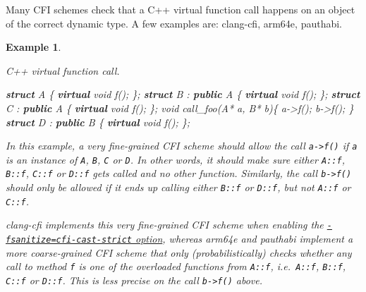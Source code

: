 \documentclass[
  a4paper,
]{report}
\newtheorem{example}{Example}
\newenvironment{Shaded}{}{}
\newcommand{\DataTypeTok}[1]{\textcolor[rgb]{0.56,0.13,0.00}{#1}}
\newcommand{\KeywordTok}[1]{\textcolor[rgb]{0.00,0.44,0.13}{\textbf{#1}}}
\newcommand{\NormalTok}[1]{#1}
\newcommand{\OperatorTok}[1]{\textcolor[rgb]{0.40,0.40,0.40}{#1}}
\begin{document}
Many CFI schemes check that a
\label{__index_entry_39}{C++} virtual function
call happens on an object of the correct dynamic type. A few examples
are: clang-cfi, arm64e, pauthabi.

\begin{example}

\label{}

\textup{C++ virtual function call.}

\begin{Shaded}
\begin{Highlighting}[]
\KeywordTok{struct}\NormalTok{ A }\OperatorTok{\{}
  \KeywordTok{virtual} \DataTypeTok{void}\NormalTok{ f}\OperatorTok{();}
\OperatorTok{\};}
\KeywordTok{struct}\NormalTok{ B }\OperatorTok{:} \KeywordTok{public}\NormalTok{ A }\OperatorTok{\{}
  \KeywordTok{virtual} \DataTypeTok{void}\NormalTok{ f}\OperatorTok{();}
\OperatorTok{\};}
\KeywordTok{struct}\NormalTok{ C }\OperatorTok{:} \KeywordTok{public}\NormalTok{ A }\OperatorTok{\{}
  \KeywordTok{virtual} \DataTypeTok{void}\NormalTok{ f}\OperatorTok{();}
\OperatorTok{\};}
\DataTypeTok{void}\NormalTok{ call\_foo}\OperatorTok{(}\NormalTok{A}\OperatorTok{*}\NormalTok{ a}\OperatorTok{,}\NormalTok{ B}\OperatorTok{*}\NormalTok{ b}\OperatorTok{)\{}
\NormalTok{  a}\OperatorTok{{-}\textgreater{}}\NormalTok{f}\OperatorTok{();}
\NormalTok{  b}\OperatorTok{{-}\textgreater{}}\NormalTok{f}\OperatorTok{();}
\OperatorTok{\}}
\KeywordTok{struct}\NormalTok{ D }\OperatorTok{:} \KeywordTok{public}\NormalTok{ B }\OperatorTok{\{}
  \KeywordTok{virtual} \DataTypeTok{void}\NormalTok{ f}\OperatorTok{();}
\OperatorTok{\};}
\end{Highlighting}
\end{Shaded}

In this example, a very fine-grained CFI scheme should allow the call
\texttt{a-\textgreater{}f()} if \texttt{a} is an instance of \texttt{A},
\texttt{B}, \texttt{C} or \texttt{D}. In other words, it should make
sure either \texttt{A::f}, \texttt{B::f}, \texttt{C::f} or \texttt{D::f}
gets called and no other function. Similarly, the call
\texttt{b-\textgreater{}f()} should only be allowed if it ends up
calling either \texttt{B::f} or \texttt{D::f}, but not \texttt{A::f} or
\texttt{C::f}.

clang-cfi implements this very fine-grained CFI scheme when enabling the
\href{https://clang.llvm.org/docs/ControlFlowIntegrity.html\#strictness}{\texttt{-fsanitize=cfi-cast-strict}
option}, whereas arm64e and pauthabi implement a more coarse-grained CFI
scheme that only (probabilistically) checks whether any call to method
\texttt{f} is one of the overloaded functions from \texttt{A::f},
i.e.~\texttt{A::f}, \texttt{B::f}, \texttt{C::f} or \texttt{D::f}. This
is less precise on the call \texttt{b-\textgreater{}f()} above.

\end{example}
\end{document}
